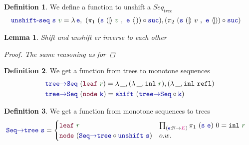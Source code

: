 \documentclass[twoside,11pt,openright]{report}
\theoremstyle{plain} %
\newtheorem{lem}[thm]{Lemma}
\theoremstyle{definition}
\newtheorem{defn}{Definition}[section]
\theoremstyle{remark}
\newcommand*{\term}[1]{\textcolor{green!30!black}{#1}} %
\newcommand*{\type}[1]{\textcolor{magenta!90!black}{#1}}
\newcommand*{\function}[1]{\textcolor{blue!60!black}{\ensuremath{\mathtt{#1}}}}
\newcommand*{\constructor}[1]{\textcolor{purple!60!black}{\ensuremath{\mathtt{#1}}}}
\newcommand*{\natcases}[2]{\ensuremath{\mathbb{[\hspace{-.5mm}\rangle}~\ensuremath{#1}~,~\ensuremath{#2}~\mathbb{\langle\hspace{-.5mm}]}}}
\begin{document}
\begin{defn}
  We define a function to unshift a \(Seq_{tree}\)
  \begin{equation}
    \begin{aligned}
      &\function{unshift\text{-}seq}~\function{s}~\term{v} = \lambda\,\function{e},~(\pi_1~(\function{s}~(\natcases{\term{v}}{\function{e}})) \circ \function{suc}) , (\pi_2~(\function{s}~(\natcases{v}{\function{e}})) \circ \function{suc})
    \end{aligned}
  \end{equation}
\end{defn}
\begin{lem}
  Shift and unshift er inverse to each other
  \begin{proof}
    The same reasoning as for 
  \end{proof}
\end{lem}
\begin{defn}
  We get a function from trees to monotone sequences
  \begin{equation}
    \begin{aligned}
      &\function{tree{\rightarrow}Seq}~(\constructor{leaf}~\term{r}) = \lambda\,\_, (\lambda\,\_, \mathtt{inl}~\term{r}) , (\lambda\,\_, \mathtt{inl}~\mathtt{refl}) \\
      &\function{tree{\rightarrow}Seq}~(\constructor{node}~\function{k}) = \function{shift}~(\function{tree{\rightarrow}Seq} \circ \function{k})
    \end{aligned}
  \end{equation}
\end{defn}
\begin{defn}
  We get a function from monotone sequences to trees
  \begin{equation}
    \begin{aligned}
      &\function{Seq{\rightarrow}tree}~\function{s} = \begin{cases} \constructor{leaf}~\term{r} & \prod_{(\function{e} : \mathbb{N} \rightarrow \type{E})} \pi_1~(\function{s}~\function{e})~0 = \mathtt{inl}~\term{r} \\ \constructor{node}~(\function{Seq{\rightarrow}tree} \circ \function{unshift}~\function{s}) & o.w.  \end{cases}
    \end{aligned}
  \end{equation}
\end{defn}
\end{document}
